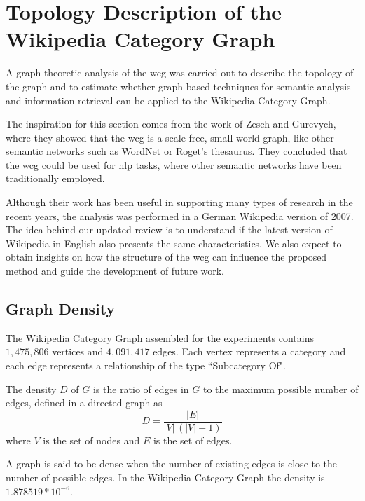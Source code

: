 \chapter{\hspace*{3pt} Topology Description of the Wikipedia Category Graph}
\label{chapter:graph}


A graph-theoretic analysis of the \gls{wcg} was carried out to describe the topology of the graph and to estimate whether graph-based techniques for semantic analysis and information retrieval can be applied to the Wikipedia Category Graph.

The inspiration for this section comes from the work of Zesch and Gurevych\cite{zesch2007analysis}, where they showed that the \gls{wcg} is a scale-free, small-world graph, like other semantic networks such as WordNet or Roget’s thesaurus. They concluded that the \gls{wcg} could be used for \gls{nlp} tasks, where other semantic networks have been traditionally employed\cite{zesch2007analysis}.

Although their work has been useful in supporting many types of research in the recent years, the analysis was performed in a German Wikipedia version of 2007. The idea behind our updated review is to understand if the latest version of Wikipedia in English also presents the same characteristics. We also expect to obtain insights on how the structure of the \gls{wcg} can influence the proposed method and guide the development of future work.



\section{\hspace*{3pt} Graph Density}

The Wikipedia Category Graph assembled for the experiments contains $1,475,806$ vertices and $4,091,417$ edges. Each vertex represents a category and each edge represents a relationship of the type ``Subcategory Of". 


The density $D$ of $G$ is the ratio of edges in $G$ to the maximum possible number of edges, defined in a directed graph as  
\begin{equation}
D={\frac  {|E|}{|V|\,(|V|-1)}}
\end{equation} where $V$ is the set of nodes and $E$ is the set of edges.

A graph is said to be dense when the number of existing edges is close to the number of possible edges. In the Wikipedia Category Graph the density is $1.878519 * 10^{-6}$.


